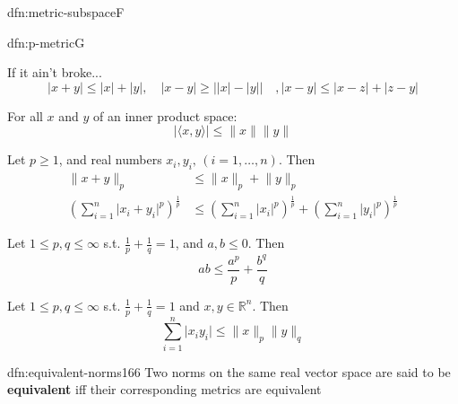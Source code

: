 \documentclass[landscape, 8pt]{extarticle}
\begin{document}
\begin{multicols}{3}
\begin{dfn}{dfn:metric-subspace}{F}
\end{dfn}

\newpage

\begin{thm}{dfn:p-metric}{G}
    \vspace{-5pt}
    \vspace{-2pt}

    If it ain't broke...
    \[\lvert x + y \rvert \le \lvert x \rvert + \lvert y \rvert, \quad \lvert x - y \rvert \ge \big\lvert \lvert x \rvert - \lvert y \rvert \big\rvert \quad, \lvert x - y \rvert \le \lvert x - z \rvert + \lvert z - y \rvert\]
    \vspace{-8pt}

    \vspace{-2pt}
    For all $x$ and $y$ of an inner product space:
    \[\lvert \langle x, y \rangle \rvert \le \lVert x \rVert \lVert y \rVert\]
    \vspace{-8pt}

    \vspace{-2pt}
    Let $p \ge 1$, and real numbers $x_{i}, y_{i},\,(i = 1,\dots,n)$. Then
    \begin{align*}
        \lVert x + y \rVert_{p} &\le \lVert x \rVert_{p} + \lVert y \rVert_{p} \\
        \left(\sum_{i = 1}^{n} \lvert x_{i} + y_{i} \rvert^{p}\right)^{\frac{1}{p}} &\le \left(\sum_{i = 1}^{n} \lvert x_{i} \rvert^{p}\right)^{\frac{1}{p}} + \left(\sum_{i = 1}^{n} \lvert y_{i} \rvert^{p}\right)^{\frac{1}{p}}
    \end{align*}

    
    Let $1 \le p, q \le \infty$ s.t. $\frac{1}{p} + \frac{1}{q} = 1$, and $a, b\le 0$. Then
    \[ab \le \frac{a^{p}}{p} + \frac{b^{q}}{q}\]
    \vspace{-3pt}

    Let $1 \le p, q \le \infty$ s.t. $\frac{1}{p} + \frac{1}{q} = 1$ and $x, y\in \mathbb{R}^{n}$. Then
    \[\sum_{i = 1}^{n} \lvert x_{i}y_{i} \rvert \le \lVert x \rVert_{p} \lVert y \rVert_{q}\]

\end{thm}

\vspace{-5pt}
\begin{dfn}{dfn:equivalent-norms}{166}
    \vspace{-5pt}
    Two norms on the same real vector space are said to be \textbf{equivalent} iff their corresponding metrics are equivalent


\end{dfn}
\end{multicols}
\end{document}
